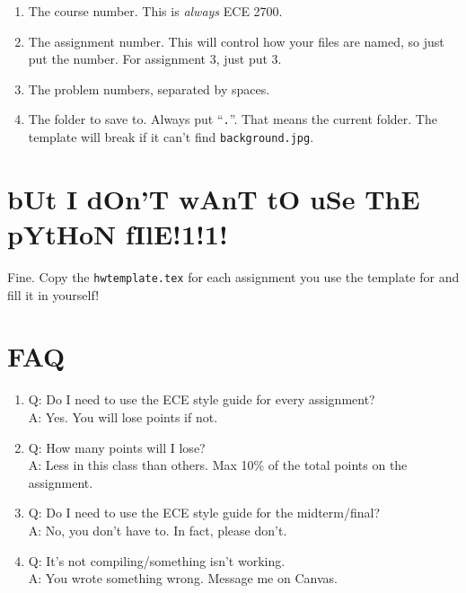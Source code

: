 \documentclass[a4paper,10pt]{article}
\begin{document}
\begin{enumerate}
	\item The course number. This is \emph{always} ECE 2700.
	\item The assignment number. This will control how your files are named, so just put the number. For assignment 3, just put 3.
	\item The problem numbers, separated by spaces.
	\item The folder to save to. Always put ``\texttt{.}''. That means the current folder. The template will break if it can't find \texttt{background.jpg}.
\end{enumerate}


\section{bUt I dOn'T wAnT tO uSe ThE pYtHoN fIlE!1!1!}

Fine. Copy the \texttt{hwtemplate.tex} for each assignment you use the template for and fill it in yourself!

\section{FAQ}

\begin{enumerate}
	\item Q: Do I need to use the ECE style guide for every assignment? \\
	\noindent A: Yes. You will lose points if not.
	\item Q: How many points will I lose? \\
	\noindent A: Less in this class than others. Max 10\% of the total points on the assignment.
	\item Q: Do I need to use the ECE style guide for the midterm/final?\\
	\noindent A: No, you don't have to. In fact, please don't.
	\item Q: It's not compiling/something isn't working. \\
	\noindent A: You wrote something wrong. Message me on Canvas.
\end{enumerate}
\end{document}
